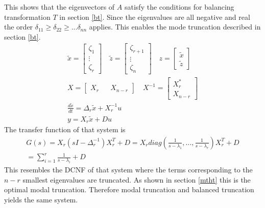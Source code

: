 This shows that the eigenvectors of \(A\) satisfy the conditions for balancing transformation \(T\) in section \ref{bt}.
Since the eigenvalues are all negative and real the order \(\delta_{11} \geq \delta_{22} \geq ...  \delta_{nn}\) applies.
This enables the mode truncation described in section \ref{bt}.
\begin{gather}
\tilde{x} = \begin{bmatrix}
\zeta_1 \\
\vdots \\
\zeta_r
\end{bmatrix} \quad 
\tilde{z} = \begin{bmatrix}
\zeta_{r+1} \\
\vdots \\
\zeta_n
\end{bmatrix} \quad
z = \begin{bmatrix}
\tilde{x} \\
\tilde{z}
\end{bmatrix}\\
X= \begin{bmatrix}
X_r && X_{n-r}
\end{bmatrix} \quad
X^{-1} = \begin{bmatrix}
X_r^{*} \\
X_{n-r}
\end{bmatrix} \\
\frac{d\tilde{x}}{dt} = \Delta_r \tilde{x} + X^{-1}_ru \\
y = X_r\tilde{x} + Du 
\end{gather}
The transfer function of that system is
\begin{gather}
G(s) = X_r(sI - \Delta_r^{-1})X_r^{T}+D = X_r diag(\frac{1}{s-\lambda_1}, ..., \frac{1}{s-\lambda_r})X_r^{T}+D \\
= \sum_{i=1}^{r} \frac{1}{s-\lambda_i} + D
\end{gather}
This resembles the DCNF of that system where the terms corresponding to the \(n-r\) smallest eigenvalues are truncated.
As shown in section \ref{mtht} this is the optimal modal truncation.
Therefore modal truncation and balanced truncation yields the same system.


